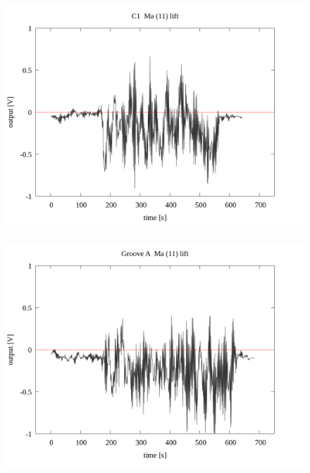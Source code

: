 \documentclass[a4paper]{jsarticle}
\begin{document}
\begin{figure}[htbp]
    \footnotesize
    \begin{center}
        \includegraphics[width=140mm]{../../../33_result/210806/moving_average/11/lift/C1_ma(11)_lift.png}
    \end{center}
\end{figure}

\begin{figure}[htbp]
    \footnotesize
    \begin{center}
        \includegraphics[width=140mm]{../../../33_result/210806/moving_average/11/lift/Groove_A_ma(11)_lift.png}
    \end{center}
\end{figure}
\end{document}
